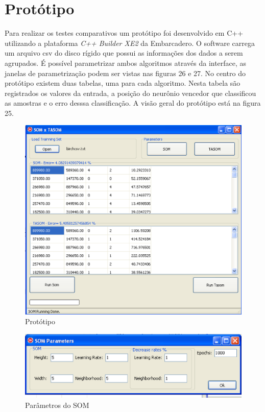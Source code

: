 \section{Protótipo}
Para realizar os testes comparativos um protótipo foi desenvolvido em C++ utilizando a plataforma \textit{C++ Builder XE2} da Embarcadero. O software carrega um arquivo csv do disco rígido que possui as informações dos dados a serem agrupados. É possível parametrizar ambos algoritmos através da interface, as janelas de parametrização podem ser vistas nas figuras 26 e 27. No centro do protótipo existem duas tabelas, uma para cada algoritmo. Nesta tabela são registrados os valores da entrada, a posição do neurônio vencedor que classificou as amostras e o erro desssa classificação. A visão geral do protótipo está na figura 25. 

\begin{figure}[!h]
\centering
\includegraphics[keepaspectratio=true,scale=0.5]
{figuras/proto.eps}
\caption{Protótipo}
\label{data_titatic}
\end{figure}

\begin{figure}[!h]
\centering
\includegraphics[keepaspectratio=true,scale=0.5]
{figuras/somparams.eps}
\caption{Parâmetros do SOM}
\label{data_titatic}
\end{figure}

